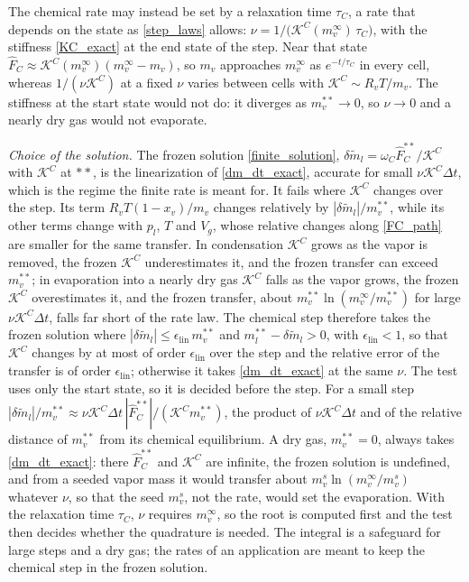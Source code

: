 The chemical rate may instead be set by a relaxation time $\tau_C$, a rate that depends on the state as \eqref{step_laws} allows: $\nu=1/\bigl(\mathcal{K}^C(m_v^\infty)\,\tau_C\bigr)$, with the stiffness \eqref{KC_exact} at the end state of the step. Near that state $\hat{F}_C\approx\mathcal{K}^C(m_v^\infty)(m_v^\infty-m_v)$, so $m_v$ approaches $m_v^\infty$ as $e^{-t/\tau_C}$ in every cell, whereas $1/(\nu\mathcal{K}^C)$ at a fixed $\nu$ varies between cells with $\mathcal{K}^C\sim R_vT/m_v$. The stiffness at the start state would not do: it diverges as $m_v^{**}\to0$, so $\nu\to0$ and a nearly dry gas would not evaporate.

\emph{Choice of the solution.} The frozen solution \eqref{finite_solution}, $\delta\tilde{m}_l=\omega_C\hat{F}_C^{**}/\mathcal{K}^C$ with $\mathcal{K}^C$ at $**$, is the linearization of \eqref{dm_dt_exact}, accurate for small $\nu\mathcal{K}^C\Delta t$, which is the regime the finite rate is meant for. It fails where $\mathcal{K}^C$ changes over the step. Its term $R_vT(1-x_v)/m_v$ changes relatively by $|\delta\tilde{m}_l|/m_v^{**}$, while its other terms change with $p_l$, $T$ and $V_g$, whose relative changes along \eqref{FC_path} are smaller for the same transfer. In condensation $\mathcal{K}^C$ grows as the vapor is removed, the frozen $\mathcal{K}^C$ underestimates it, and the frozen transfer can exceed $m_v^{**}$; in evaporation into a nearly dry gas $\mathcal{K}^C$ falls as the vapor grows, the frozen $\mathcal{K}^C$ overestimates it, and the frozen transfer, about $m_v^{**}\ln(m_v^\infty/m_v^{**})$ for large $\nu\mathcal{K}^C\Delta t$, falls far short of the rate law. The chemical step therefore takes the frozen solution where $|\delta\tilde{m}_l|\le\epsilon_{\mathrm{lin}}\,m_v^{**}$ and $m_l^{**}-\delta\tilde{m}_l>0$, with $\epsilon_{\mathrm{lin}}<1$, so that $\mathcal{K}^C$ changes by at most of order $\epsilon_{\mathrm{lin}}$ over the step and the relative error of the transfer is of order $\epsilon_{\mathrm{lin}}$; otherwise it takes \eqref{dm_dt_exact} at the same $\nu$. The test uses only the start state, so it is decided before the step. For a small step $|\delta\tilde{m}_l|/m_v^{**}\approx\nu\mathcal{K}^C\Delta t\,|\hat{F}_C^{**}|/(\mathcal{K}^Cm_v^{**})$, the product of $\nu\mathcal{K}^C\Delta t$ and of the relative distance of $m_v^{**}$ from its chemical equilibrium. A dry gas, $m_v^{**}=0$, always takes \eqref{dm_dt_exact}: there $\hat{F}_C^{**}$ and $\mathcal{K}^C$ are infinite, the frozen solution is undefined, and from a seeded vapor mass it would transfer about $m_v^{s}\ln(m_v^\infty/m_v^{s})$ whatever $\nu$, so that the seed $m_v^s$, not the rate, would set the evaporation. With the relaxation time $\tau_C$, $\nu$ requires $m_v^\infty$, so the root is computed first and the test then decides whether the quadrature is needed. The integral is a safeguard for large steps and a dry gas; the rates of an application are meant to keep the chemical step in the frozen solution.

